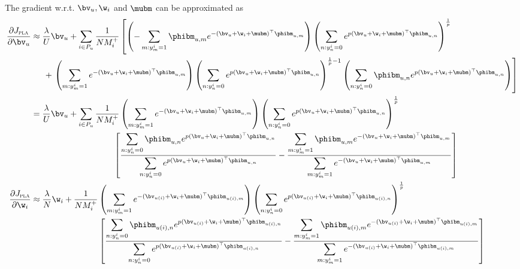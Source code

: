 The gradient w.r.t. $\bv_u, \w_i$ and $\mubm$ can be approximated as 
\begin{equation*}
\begin{aligned}
\frac{\partial J_\textsc{pla}}{\partial \bv_u}
&\approx \frac{\lambda}{U} \bv_u
  + \sum_{i \in P_u} \frac{1}{N M_i^+} \left[
    \left(-\sum_{m: y_m^i = 1} \phibm_{u,m} e^{-(\bv_u + \w_i + \mubm)^\top \phibm_{u,m}} \right)
    \left( \sum_{n: y_n^i = 0} e^{p (\bv_u + \w_i + \mubm)^\top \phibm_{u,n}} \right)^\frac{1}{p} \right. \\
& \hspace{1.5em} + \left.
    \left( \sum_{m: y_m^i = 1} e^{-(\bv_u + \w_i + \mubm)^\top \phibm_{u,m}} \right)
    \left( \sum_{n: y_n^i = 0} e^{p (\bv_u + \w_i + \mubm)^\top \phibm_{u,n}} \right)^{\frac{1}{p} - 1}
    \left( \sum_{n: y_n^i = 0} \phibm_{u,n} e^{p (\bv_u + \w_i + \mubm)^\top \phibm_{u,n}} \right) \right] \\
&= \frac{\lambda}{U} \bv_u
  + \sum_{i \in P_u} \frac{1}{N M_i^+} 
    \left( \sum_{m: y_m^i = 1} e^{-(\bv_u + \w_i + \mubm)^\top \phibm_{u,m}} \right)
    \left( \sum_{n: y_n^i = 0} e^{p (\bv_u + \w_i + \mubm)^\top \phibm_{u,n}} \right)^\frac{1}{p} \\
& \hspace{9.8em} \left[ 
    \frac{ \displaystyle \sum_{n: y_n^i = 0} \phibm_{u,n} e^{p (\bv_u + \w_i + \mubm)^\top \phibm_{u,n}} }
         { \displaystyle \sum_{n: y_n^i = 0} e^{p (\bv_u + \w_i + \mubm)^\top \phibm_{u,n}} }
    - \frac{ \displaystyle \sum_{m: y_m^i = 1} \phibm_{u,m} e^{-(\bv_u + \w_i + \mubm)^\top \phibm_{u,m}} }
           { \displaystyle \sum_{m: y_m^i = 1} e^{-(\bv_u + \w_i + \mubm)^\top \phibm_{u,m}} } \right] \\
%
\frac{\partial J_\textsc{pla}}{\partial \w_i}
&\approx \frac{\lambda}{N} \w_i
  + \frac{1}{N M_i^+} 
    \left( \sum_{m: y_m^i = 1} e^{-(\bv_{u(i)} + \w_i + \mubm)^\top \phibm_{u(i),m}} \right)
    \left( \sum_{n: y_n^i = 0} e^{p (\bv_{u(i)} + \w_i + \mubm)^\top \phibm_{u(i),n}} \right)^\frac{1}{p} \\
& \hspace{8em} \left[ 
    \frac{ \displaystyle \sum_{n: y_n^i = 0} \phibm_{u(i),n} e^{p (\bv_{u(i)} + \w_i + \mubm)^\top \phibm_{u(i),n}} }
         { \displaystyle \sum_{n: y_n^i = 0} e^{p (\bv_{u(i)} + \w_i + \mubm)^\top \phibm_{u(i),n}} }
    - \frac{ \displaystyle \sum_{m: y_m^i = 1} \phibm_{u(i),m} e^{-(\bv_{u(i)} + \w_i + \mubm)^\top \phibm_{u(i),m}} }
           { \displaystyle \sum_{m: y_m^i = 1} e^{-(\bv_{u(i)} + \w_i + \mubm)^\top \phibm_{u(i),m}} } \right] \\

\end{aligned}
\end{equation*}
